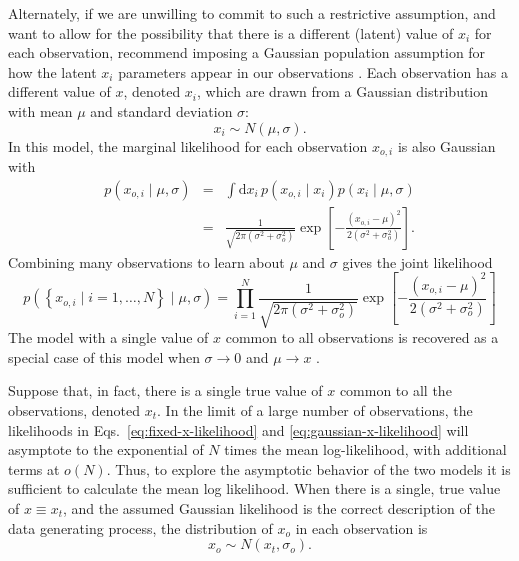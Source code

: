 \documentclass[modern]{aastex631}
\begin{document}
Alternately, if we are unwilling to commit to such a restrictive assumption, and
want to allow for the possibility that there is a different (latent) value of
$x_i$ for each observation, \citet{Isi2019} recommend imposing a Gaussian
population assumption for how the latent $x_i$ parameters appear in our
observations \citep{Isi2019,Isi2022}.  Each observation has a different value of
$x$, denoted $x_i$, which are drawn from a Gaussian distribution with mean $\mu$
and standard deviation $\sigma$:
\begin{equation}
    x_i \sim N\left( \mu, \sigma \right).
\end{equation}
In this model, the marginal likelihood for each observation $x_{o,i}$ is also
Gaussian with 
\begin{eqnarray}
    p\left( x_{o,i} \mid \mu, \sigma \right) & = & \int \mathrm{d} x_i \, p\left( x_{o,i} \mid x_i \right) p\left( x_i \mid \mu, \sigma \right) \nonumber \\ & = & \frac{1}{\sqrt{2 \pi \left( \sigma^2 + \sigma_o^2 \right)}} \exp\left[ -\frac{\left( x_{o,i} - \mu \right)^2}{2 \left( \sigma^2 + \sigma_o^2 \right)} \right].
\end{eqnarray}
Combining many observations to learn about $\mu$ and $\sigma$ gives the joint
likelihood 
\begin{equation}
    \label{eq:gaussian-x-likelihood}
    p\left( \left\{ x_{o,i} \mid i = 1, \ldots, N \right\} \mid \mu, \sigma \right) = \prod_{i=1}^N \frac{1}{\sqrt{2 \pi \left( \sigma^2 + \sigma_o^2 \right)}} \exp\left[ -\frac{\left( x_{o,i} - \mu \right)^2}{2 \left( \sigma^2 + \sigma_o^2 \right)} \right]
\end{equation}
The model with a single value of $x$ common to all observations is recovered as
a special case of this model when $\sigma \to 0$ and $\mu \to x$
\citep{Isi2019,Isi2022}.

Suppose that, in fact, there is a single true value of $x$ common to all the
observations, denoted $x_t$.  In the limit of a large number of observations,
the likelihoods in Eqs.\ \eqref{eq:fixed-x-likelihood} and
\eqref{eq:gaussian-x-likelihood} will asymptote to the exponential of $N$ times
the mean log-likelihood, with additional terms at $o(N)$.  Thus, to explore the
asymptotic behavior of the two models it is sufficient to calculate the mean log
likelihood.  When there is a single, true value of $x \equiv x_t$, and the
assumed Gaussian likelihood is the correct description of the data generating
process, the distribution of $x_{o}$ in each observation is 
\begin{equation}
    x_o \sim N\left( x_t, \sigma_o \right).
\end{equation}
\end{document}

